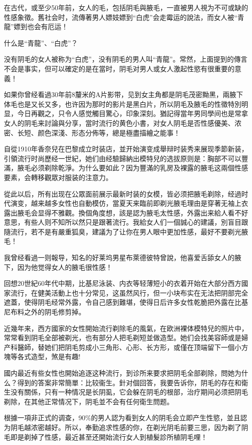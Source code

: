 \documentclass[12pt,UTF8]{ctexbook}
\begin{document}
在古代，或至少50年前，女人的毛，包括阴毛與腋毛，一直被男人視为不可或缺的性感象徵。舊社会时，流傳著男人嫖妓嫖到“白虎”会走霉运的說法，而女人被“青龍”嫖到也会有厄运！

什么是“青龍”、“白虎”？

没有阴毛的女人被称为“白虎”，没有阴毛的男人叫“青龍”。常然，上面提到的傳言不会是事实，但可以確定的是在當时，阴毛对男人或女人激起性慾有很重要的意義！

如果你曾经看過30年前8釐米的A片影带，见到女主角都是阴毛茂密黝黑，兩腋下体毛也是又长又多，也许因为那时的影片是黑白片，所以阴毛及腋毛的性徵特別明显，今日再觀之，只令人感觉觸目驚心，印象深刻。猶記得當年男同學间也是常拿女人的阴毛来討論與分享，當时流行的黄色小書，对女人阴毛是否性感優美、浓密、长短、颜色深淺、形态分佈等，總是極盡描繪之能事！

自從1910年香奈兒在巴黎成立时装店，並开始演变成舉辩时装秀来展现季節新装，引領流行时尚歷经一世紀，她们由经驗歸納出模特兒的选拔原则是：胸部不可以豐滿，腋毛必须剃除乾淨。为什么要如此？因为豐滿的乳房及裸露的腋毛这兩個性感要素，会轉移觀眾对服装的注意力。

從此以后，所有出现在公眾面前展示最新时装的女模，皆必须把腋毛剃除，经過时代演变，越来越多女性也自動模仿，當夏天来臨前即剃光腋毛理由是穿著无袖上衣露出腋毛会显得不雅觀。換個角度想，該是認为腋毛太性感，外露出来給人看不好意思，有些人则不知所以然只是跟著流行。我給女人们一個誠心的建議，別盲目跟隨流行，若不是有嚴重狐臭，建議为了让你在男人眼中更加性感，最好不要剃光腋毛！

我曾经看過一则報导，知名的好莱坞男星布萊德彼特曾說，他喜爱舌舔女人的腋下，因为他觉得女人的腋毛很性感！

回想20世紀60年代中期，比基尼泳装、内衣等轻薄短小的衣着开始在大部分西方國家流行，在健美活動上也十分常见，这虽然风行，但一小块布实在无法把阴部完全遮蓋，使得阴毛经常外露，令自己感到難堪，使得日后许多女性乾脆把外露在比基尼布料之外的阴毛修剪掉。

近幾年来，西方國家的女性開始流行剃除毛的風氣，在欧洲裸体模特兒的照片中，常常看到阴毛全部被剃光，也有部分人把毛剃短並做造型。她们会找美容師或是婦产科醫師，替她们把阴毛剪成小三角形、心形、长方形，或僅在顶端留下一個小方塊等各式造型，煞是有趣!

國内最近有些女性也開始追逐这种流行，到诊所来要求把阴毛全部剃除，問她为什么？得到的答案非常簡單：比较衞生。針对個回答，我要告诉你，阴毛的存在和衛生没有關係，只有一种情况是长阴虱，它会躲在阴毛的根部，治疗期间必须把阴毛剃除，在其他正常情况下，阴毛並不会有任何衛生問题。

根據一項非正式的调查，90\%的男人認为看到女人的阴毛会立即产生性慾，並且認为阴毛越浓密越好。所以，奉勤追求性感的你，在剃光阴毛前要三思，因为剃了阴毛即是剃掉了性感，最近甚至还開始流行女人到植髮診所植阴毛哩！
\end{document}
